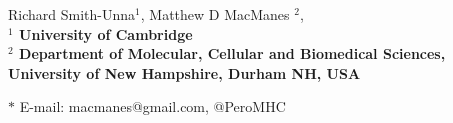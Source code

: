 \documentclass[11pt]{article}
\begin{document}
Richard Smith-Unna$^{1}$, 
Matthew D MacManes $^{2}$, 
\\


\bf{$^{1}$} University of Cambridge \\
\bf{$^{2}$} Department of Molecular, Cellular and Biomedical Sciences, University of New Hampshire, Durham NH, USA


$\ast$ E-mail: macmanes@gmail.com, @PeroMHC
\end{document}
